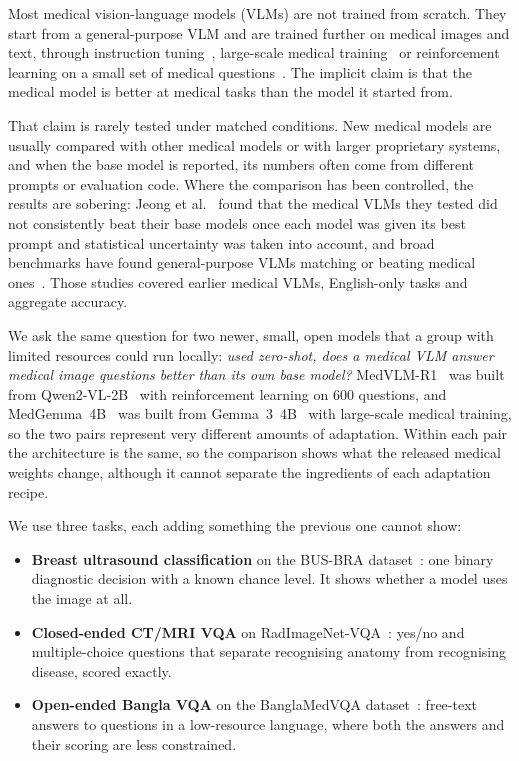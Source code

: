 \documentclass[doublecolumn]{ijcvsplatex}
\newcommand{\qwen}{Qwen2-VL}
\newcommand{\medvlm}{MedVLM-R1}
\newcommand{\gemma}{Gemma~3}
\newcommand{\medgemma}{MedGemma}
\begin{document}
Most medical vision-language models (VLMs) are not trained from scratch. They start from a general-purpose VLM and are trained further on medical images and text, through instruction tuning~\cite{li2023llavamed,chen2024huatuogptvision}, large-scale medical training~\cite{sellergren2025medgemma} or reinforcement learning on a small set of medical questions~\cite{pan2025medvlmr1}. The implicit claim is that the medical model is better at medical tasks than the model it started from.

That claim is rarely tested under matched conditions. New medical models are usually compared with other medical models or with larger proprietary systems, and when the base model is reported, its numbers often come from different prompts or evaluation code. Where the comparison has been controlled, the results are sobering: Jeong et al.~\cite{jeong2025limited} found that the medical VLMs they tested did not consistently beat their base models once each model was given its best prompt and statistical uncertainty was taken into account, and broad benchmarks have found general-purpose VLMs matching or beating medical ones~\cite{hu2024omnimedvqa,liu2025howfar}. Those studies covered earlier medical VLMs, English-only tasks and aggregate accuracy.

We ask the same question for two newer, small, open models that a group with limited resources could run locally: \emph{used zero-shot, does a medical VLM answer medical image questions better than its own base model?} \medvlm{}~\cite{pan2025medvlmr1} was built from \qwen{}-2B~\cite{wang2024qwen2vl} with reinforcement learning on 600 questions, and \medgemma{}~4B~\cite{sellergren2025medgemma} was built from \gemma{}~4B~\cite{gemma3} with large-scale medical training, so the two pairs represent very different amounts of adaptation. Within each pair the architecture is the same, so the comparison shows what the released medical weights change, although it cannot separate the ingredients of each adaptation recipe.

We use three tasks, each adding something the previous one cannot show:
\begin{itemize}
\item \textbf{Breast ultrasound classification} on the BUS-BRA dataset~\cite{gomezflores2024busbra}: one binary diagnostic decision with a known chance level. It shows whether a model uses the image at all.
\item \textbf{Closed-ended CT/MRI VQA} on RadImageNet-VQA~\cite{butsanets2025radimagenetvqa}: yes/no and multiple-choice questions that separate recognising anatomy from recognising disease, scored exactly.
\item \textbf{Open-ended Bangla VQA} on the BanglaMedVQA dataset~\cite{ahmed2026banglamedvqa}: free-text answers to questions in a low-resource language, where both the answers and their scoring are less constrained.
\end{itemize}
\end{document}
